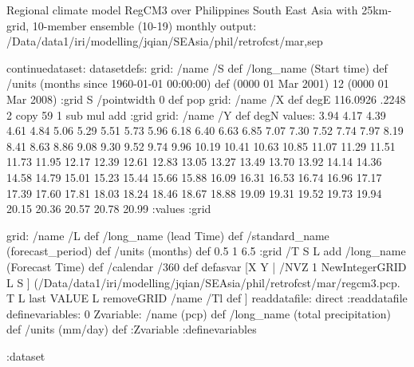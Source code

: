 Regional climate model RegCM3 over Philippines South East Asia  with 25km-grid, 10-member ensemble (10-19) monthly output:
/Data/data1/iri/modelling/jqian/SEAsia/phil/retrofcst/mar,sep

\begin{ingrid}
continuedataset:
datasetdefs:
grid:
/name /S def
/long_name (Start time) def
/units (months since  1960-01-01 00:00:00) def
(0000 01 Mar 2001)
12
(0000 01 Mar 2008)
:grid
S /pointwidth 0 def pop
grid:
/name /X def
degE
116.0926 .2248 2 copy 59 1 sub mul add
:grid
grid:
/name /Y def
degN
values:
3.94   4.17   4.39   4.61   4.84   5.06   5.29   5.51   5.73   5.96
   6.18   6.40   6.63   6.85   7.07   7.30   7.52   7.74   7.97   8.19
   8.41   8.63   8.86   9.08   9.30   9.52   9.74   9.96  10.19  10.41
  10.63  10.85  11.07  11.29  11.51  11.73  11.95  12.17  12.39  12.61
  12.83  13.05  13.27  13.49  13.70  13.92  14.14  14.36  14.58  14.79
  15.01  15.23  15.44  15.66  15.88  16.09  16.31  16.53  16.74  16.96
  17.17  17.39  17.60  17.81  18.03  18.24  18.46  18.67  18.88  19.09
  19.31  19.52  19.73  19.94  20.15  20.36  20.57  20.78  20.99
:values
:grid

grid:
/name /L def
/long_name (lead Time) def
/standard_name (forecast_period) def
/units (months) def
0.5 1 6.5
:grid
/T{
S L add
/long_name (Forecast Time) def
/calendar /360 def
}defasvar
[X
    Y | /NVZ 1 NewIntegerGRID 
  L S ]  (/Data/data1/iri/modelling/jqian/SEAsia/phil/retrofcst/mar/regcm3.pcp.%
T L last VALUE  L removeGRID /name /Tl def
] 
readdatafile: 
direct
:readdatafile
definevariables:
0 Zvariable: /name (pcp) def /long_name (total precipitation)  def /units (mm/day) def
:Zvariable
:definevariables

:dataset
\end{ingrid}
